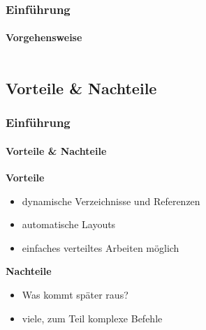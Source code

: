 
\begin{frame}
\frametitle{Einf\"uhrung}
\framesubtitle{Vorgehensweise}
\begin{columns}[onlytextwidth]
\begin{column}{0.40\textwidth}
\end{column}
\begin{column}{0.25\textwidth}
\end{column}
\begin{column}{0.25\textwidth}
\end{column}
\end{columns}
\end{frame}



\subsection{Vorteile \& Nachteile}
\begin{frame}
\frametitle{Einf\"uhrung}
\framesubtitle{Vorteile \& Nachteile}
\textbf{Vorteile}
\begin{itemize}
\item  dynamische Verzeichnisse und Referenzen
\item  automatische Layouts
\item  einfaches verteiltes Arbeiten möglich
\end{itemize}

\textbf{Nachteile}
\begin{itemize}
\item  Was kommt später raus?
\item  viele, zum Teil komplexe Befehle
\end{itemize}
\end{frame}


